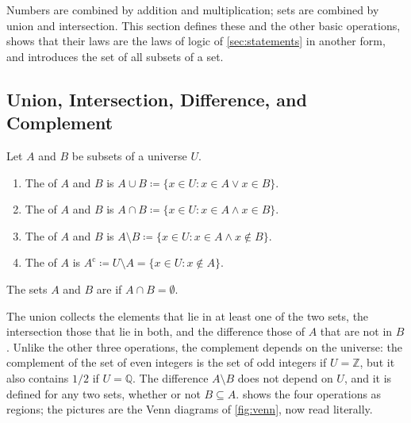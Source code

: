 Numbers are combined by addition and multiplication; sets are combined by union and intersection. This section defines these and the other basic operations, shows that their laws are the laws of logic of \cref{sec:statements} in another form, and introduces the set of all subsets of a set.

\subsection{Union, Intersection, Difference, and Complement}

\begin{definition}
\label{def:set-operations}
Let $A$ and $B$ be subsets of a universe $U$.
\begin{enumerate}
\item The  of $A$ and $B$ is $A\cup B\coloneqq\{x\in U: x\in A\vee x\in B\}$.
\item The  of $A$ and $B$ is $A\cap B\coloneqq\{x\in U: x\in A\wedge x\in B\}$.
\item The  of $A$ and $B$ is $A\setminus B\coloneqq\{x\in U: x\in A\wedge x\notin B\}$.
\item The  of $A$ is $A^{\mathrm c}\coloneqq U\setminus A=\{x\in U: x\notin A\}$.
\end{enumerate}
The sets $A$ and $B$ are  if $A\cap B=\emptyset$.
\end{definition}

The union collects the elements that lie in at least one of the two sets, the intersection those that lie in both, and the difference those of $A$ that are not in $B$. Unlike the other three operations, the complement depends on the universe: the complement of the set of even integers is the set of odd integers if $U=\mathbb Z$, but it also contains $1/2$ if $U=\mathbb Q$. The difference $A\setminus B$ does not depend on $U$, and it is defined for any two sets, whether or not $B\subseteq A$.  shows the four operations as regions; the pictures are the Venn diagrams of \cref{fig:venn}, now read literally.

